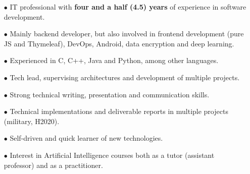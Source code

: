 \begin{itemize}

    \item[$\bullet$] IT professional with \textbf{four and a half (4.5) years} of experience in software development. 
    
    \item[$\bullet$] Mainly backend developer, but also involved in frontend development (pure JS and Thymeleaf), DevOps, Android, data encryption and deep learning. 
    
    \item[$\bullet$] Experienced in C, C++, Java and Python, among other languages.

    \item[$\bullet$] Tech lead, supervising architectures and development of multiple projects.

    \item[$\bullet$] Strong technical writing, presentation and communication skills.
    
    \item[$\bullet$] Technical implementations and deliverable reports in multiple projects (military, H2020).

    \item[$\bullet$] Self-driven and quick learner of new technologies.

    \item[$\bullet$] Interest in Artificial Intelligence courses both as a tutor (assistant professor) and as a practitioner.

\end{itemize}